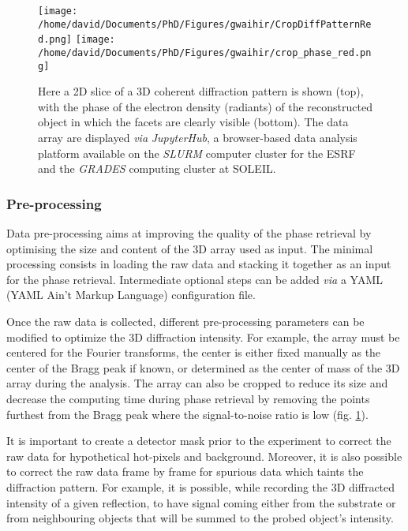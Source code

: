 \begin{figure}[!htb]
    \centering
    \texttt{[image: /home/david/Documents/PhD/Figures/gwaihir/CropDiffPatternRed.png]}
    \texttt{[image: /home/david/Documents/PhD/Figures/gwaihir/crop\_phase\_red.png]}
    \caption{
    Here a 2D slice of a 3D coherent diffraction pattern is shown (top), with the phase of the electron density (radiants) of the reconstructed object in which the facets are clearly visible (bottom). The data array are displayed \textit{via} \textit{JupyterHub}, a browser-based data analysis platform available on the \textit{SLURM} computer cluster for the ESRF and the \textit{GRADES} computing cluster at SOLEIL.
    }
    \label{fig:GUI_file}
\end{figure}

\subsubsection{Pre-processing}

Data pre-processing aims at improving the quality of the phase retrieval by optimising the size and content of the 3D array used as input.
The minimal processing consists in loading the raw data and stacking it together as an input for the phase retrieval.
Intermediate optional steps can be added \textit{via} a YAML (YAML Ain't Markup Language) configuration file.

Once the raw data is collected, different pre-processing parameters can be modified to optimize the 3D diffraction intensity.
For example, the array must be centered for the Fourier transforms, the center is either fixed manually as the center of the Bragg peak if known, or determined as the center of mass of the 3D array during the analysis.
The array can also be cropped to reduce its size and decrease the computing time during phase retrieval by removing the points furthest from the Bragg peak where the signal-to-noise ratio is low (fig. \ref{fig:GUI_file}).

It is important to create a detector mask prior to the experiment to correct the raw data for hypothetical hot-pixels and background.
Moreover, it is also possible to correct the raw data frame by frame for spurious data which taints the diffraction pattern.
For example, it is possible, while recording the 3D diffracted intensity of a given reflection, to have signal coming either from the substrate or from neighbouring objects that will be summed to the probed object's intensity.

